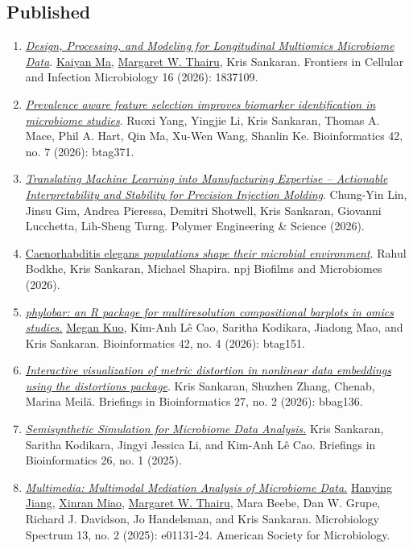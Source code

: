 \documentclass[letterpaper]{article}
\begin{document}
\subsection*{Published}
\begin{enumerate}
  \item \href{https://doi.org/10.3389/fcimb.2026.1837109}{\textit{Design, Processing, and Modeling for Longitudinal Multiomics Microbiome Data}}. \underline{Kaiyan Ma}, \underline{Margaret W. Thairu}, Kris Sankaran. Frontiers in Cellular and Infection Microbiology 16 (2026): 1837109.
  \item \href{https://doi.org/10.1093/bioinformatics/btag371}{\textit{Prevalence aware feature selection improves biomarker identification in microbiome studies}}. Ruoxi Yang, Yingjie Li, Kris Sankaran, Thomas A. Mace, Phil A. Hart, Qin Ma, Xu-Wen Wang, Shanlin Ke. Bioinformatics 42, no. 7 (2026): btag371.
  \item \href{https://doi.org/10.1002/pen.70745}{\textit{Translating Machine Learning into Manufacturing Expertise -- Actionable Interpretability and Stability for Precision Injection Molding}}. Chung-Yin Lin, Jinsu Gim, Andrea Pieressa, Demitri Shotwell, Kris Sankaran, Giovanni Lucchetta, Lih-Sheng Turng. Polymer Engineering \& Science (2026).
  \item \href{https://doi.org/10.1038/s41522-026-00975-z}{Caenorhabditis elegans \textit{populations shape their microbial environment}}. Rahul Bodkhe, Kris Sankaran, Michael Shapira. npj Biofilms and Microbiomes (2026).
  \item \href{https://doi.org/10.1093/bioinformatics/btag151}{\textit{phylobar: an R package for multiresolution compositional barplots in omics studies.}} \underline{Megan Kuo}, Kim-Anh Lê Cao, Saritha Kodikara, Jiadong Mao, and Kris Sankaran. Bioinformatics 42, no. 4 (2026): btag151.
  \item \href{https://doi.org/10.1093/bib/bbag136}{\textit{Interactive visualization of metric distortion in nonlinear data embeddings using the distortions package}}. Kris Sankaran, Shuzhen Zhang, Chenab, Marina Meilă. Briefings in Bioinformatics 27, no. 2 (2026): bbag136.
  \item \href{https://doi.org/10.1093/bib/bbaf051}{\textit{Semisynthetic Simulation for Microbiome Data Analysis.}} Kris Sankaran, Saritha Kodikara, Jingyi Jessica Li, and Kim-Anh Lê Cao. Briefings in Bioinformatics 26, no. 1 (2025).
  \item \href{https://doi.org/10.1128/spectrum.01131-24}{\textit{Multimedia: Multimodal Mediation Analysis of Microbiome Data.}} \underline{Hanying Jiang}, \underline{Xinran Miao}, \underline{Margaret W. Thairu}, Mara Beebe, Dan W. Grupe, Richard J. Davidson, Jo Handelsman, and Kris Sankaran. Microbiology Spectrum 13, no. 2 (2025): e01131-24. American Society for Microbiology.

\end{enumerate}
\end{document}
